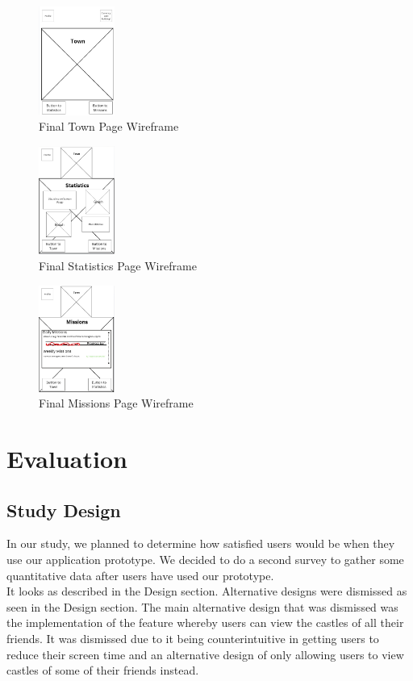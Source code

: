 \documentclass[sigconf, 11pt]{acmart}
\begin{document}
\begin{figure}[h]
\includegraphics[width=2.5cm]{images/Second Town Design.jpg}
\caption{Final Town Page Wireframe}
\end{figure}

\begin{figure}[h]
\includegraphics[width=2.5cm]{images/Second Statistic Design.jpg}
\caption{Final Statistics Page Wireframe}
\end{figure}

\begin{figure}[h]
\includegraphics[width=2.5cm]{images/Second Missions Design.jpg}
\caption{Final Missions Page Wireframe}
\end{figure}


\section{Evaluation}
\subsection{Study Design}
In our study, we planned to determine how satisfied users would be when they use our application prototype. We decided to do a second survey to gather some quantitative data after users have used our prototype.
\\

It looks as described in the Design section. Alternative designs were dismissed as seen in the Design section. The main alternative design that was dismissed was the implementation of the feature whereby users can view the castles of all their friends. It was dismissed due to it being counterintuitive in getting users to reduce their screen time and an alternative design of only allowing users to view castles of some of their friends instead. 
\end{document}
